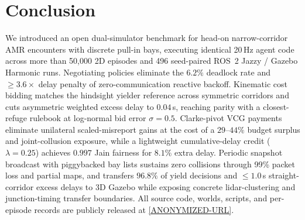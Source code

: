 \documentclass[letterpaper,journal]{IEEEtran}
\begin{document}
\section{Conclusion}\label{sec:conc}
We introduced an open dual-simulator benchmark for head-on narrow-corridor AMR encounters with discrete pull-in bays, executing identical 20\,Hz agent code across more than 50,000 2D episodes and 496 seed-paired ROS~2 Jazzy / Gazebo Harmonic runs. Negotiating policies eliminate the $6.2\%$ deadlock rate and $\ge 3.6\times$ delay penalty of zero-communication reactive backoff. Kinematic cost bidding matches the hindsight yielder reference across symmetric corridors and cuts asymmetric weighted excess delay to $0.04$\,s, reaching parity with a closest-refuge rulebook at log-normal bid error $\sigma=0.5$. Clarke-pivot VCG payments eliminate unilateral scaled-misreport gains at the cost of a $29$--$44\%$ budget surplus and joint-collusion exposure, while a lightweight cumulative-delay credit ($\lambda=0.25$) achieves $0.997$ Jain fairness for $8.1\%$ extra delay. Periodic snapshot broadcast with piggybacked bay lists sustains zero collisions through 99\% packet loss and partial maps, and transfers $96.8\%$ of yield decisions and $\le 1.0$\,s straight-corridor excess delays to 3D Gazebo while exposing concrete lidar-clustering and junction-timing transfer boundaries. All source code, worlds, scripts, and per-episode records are publicly released at \url{[ANONYMIZED-URL]}.

\patchcmd{\thebibliography}{\footnotesize}{\footnotesize\setlength{\itemsep}{0pt}\setlength{\parskip}{0pt}\linespread{0.88}\selectfont}{}{}


\end{document}
